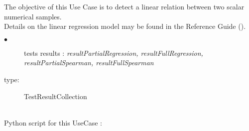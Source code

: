 \renewcommand{\filename}{docUC_InputWithData_RegressionTest.tex}
\renewcommand{\filetitle}{UC : Regression test between two scalar numerical samples}

\HeaderIIILevel






The objective of this Use Case is to detect a linear relation between two scalar numerical samples. \\



Details on the linear regression model  may be found in the Reference Guide ().\\



             {
               \begin{description}
               \item[$\bullet$] tests results : {\itshape resultPartialRegression, resultFullRegression, resultPartialSpearman, resultFullSpearman}
               \item[type:] TestResultCollection
               \end{description}
             }

             \textspace\\
             Python script for this UseCase :

